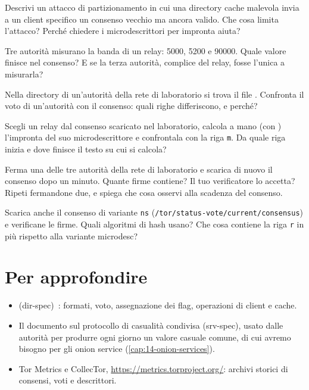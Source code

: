 \begin{esercizio}[2]\label{es:12-partizione}
Descrivi un attacco di partizionamento in cui una directory cache malevola invia a un client specifico un consenso vecchio ma ancora valido. Che cosa limita l'attacco? Perché chiedere i microdescrittori per impronta aiuta?
\end{esercizio}

\begin{esercizio}[2]\label{es:12-mediana}
Tre autorità misurano la banda di un relay: 5000, 5200 e 90000. Quale valore finisce nel consenso? E se la terza autorità, complice del relay, fosse l'unica a misurarla?
\end{esercizio}

\begin{esercizio}[2]\label{es:12-voti}
Nella directory di un'autorità della rete di laboratorio si trova il file . Confronta il voto di un'autorità con il consenso: quali righe differiscono, e perché?
\end{esercizio}

\begin{esercizio}[2]\label{es:12-md}
Scegli un relay dal consenso scaricato nel laboratorio, calcola a mano (con ) l'impronta del suo microdescrittore e confrontala con la riga \texttt{m}. Da quale riga inizia e dove finisce il testo su cui si calcola?
\end{esercizio}

\begin{esercizio}[3]\label{es:12-autorita}
Ferma una delle tre autorità della rete di laboratorio e scarica di nuovo il consenso dopo un minuto. Quante firme contiene? Il tuo verificatore lo accetta? Ripeti fermandone due, e spiega che cosa osservi alla scadenza del consenso.
\end{esercizio}

\begin{esercizio}[3]\label{es:12-ns}
Scarica anche il consenso di variante \texttt{ns} (\nolinkurl{/tor/status-vote/current/consensus}) e verificane le firme. Quali algoritmi di hash usano? Che cosa contiene la riga \texttt{r} in più rispetto alla variante microdesc?
\end{esercizio}

\section*{Per approfondire}
\begin{itemize}
  \item {} (dir-spec)~\cite{torspec}: formati, voto, assegnazione dei flag, operazioni di client e cache.
  \item Il documento sul protocollo di casualità condivisa (srv-spec), usato dalle autorità per produrre ogni giorno un valore casuale comune, di cui avremo bisogno per gli onion service (\cref{cap:14-onion-services}).
  \item Tor Metrics e CollecTor, \url{https://metrics.torproject.org/}: archivi storici di consensi, voti e descrittori.
\end{itemize}
